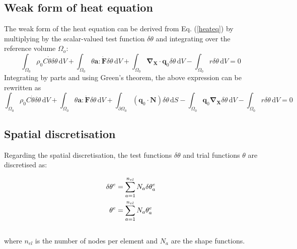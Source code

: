 \documentclass[oneside,11pt,times]{book}
\begin{document}
\subsection{Weak form of heat equation}
 \label{subsectionWeakFormHeat}
The weak form of the heat equation can be derived from Eq. (\ref{heateq}) by multiplying by the scalar-valued test function $\delta\theta$ and integrating over the reference volume $\Omega_{o}$:
%
\begin{equation} \label{equationWeakFormHeat0}
\int_{\Omega_0} \rho_0C\dot{\theta}\delta\theta\, \text{d} V+\int_{\Omega_0} \theta\bm{a}:\dot{\bm{F}}\delta\theta\, \text{d} V+\int_{\Omega_0}\bm{\nabla_{X}}\cdot\bm{q}_0\delta\theta\, \text{d} V-\int_{\Omega_0}r\delta\theta\, \text{d} V=0
\end{equation}
%
Integrating by parts and using Green's theorem, the above expression can be rewritten as
%
\begin{equation} \label{equationWeakFormHeat}
\int_{\Omega_0} \rho_0C\dot{\theta}\delta\theta\, \text{d} V+\int_{\Omega_0} \theta\bm{a}:\dot{\bm{F}}\delta\theta\, \text{d} V+\int_{\partial \Omega_0} (\bm{q}_0 \cdot \bm{N}) \delta\theta \, \text{d} S-\int_{\Omega_0}\bm{q}_0\bm{\nabla_{X}}\delta\theta\, \text{d} V-\int_{\Omega_0}r\delta\theta\, \text{d} V=0
\end{equation}
%

\subsection{Spatial discretisation}

Regarding the spatial discretisation, the test functions $\delta\theta$ and trial functions $\theta$ are discretised as:

\begin{equation}
\begin{aligned}
\centering
\delta\theta^{e}&=\sum_{a=1}^{n_{el}}N_{a}\delta\theta_{a}^{e}\\
\theta^{e}&=\sum_{a=1}^{n_{el}}N_{a}\theta_{a}^{e}
\end{aligned}
\label{equationThetaspatial}
\end{equation}
\\
where $n_{el}$ is the number of nodes per element and $N_a$ are the shape functions.\\

\end{document}
